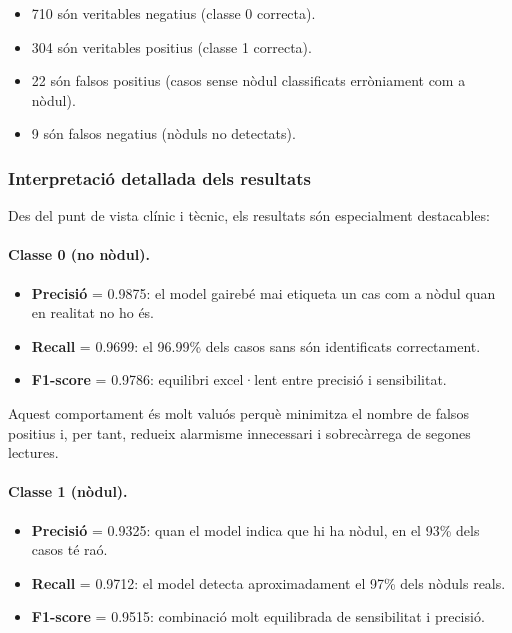 \documentclass[12pt,a4paper]{article}
\begin{document}
\begin{itemize}
    \item 710 són veritables negatius (classe 0 correcta).
    \item 304 són veritables positius (classe 1 correcta).
    \item 22 són falsos positius (casos sense nòdul classificats erròniament com a nòdul).
    \item 9 són falsos negatius (nòduls no detectats).
\end{itemize}

\subsubsection{Interpretació detallada dels resultats}

Des del punt de vista clínic i tècnic, els resultats són especialment destacables:

\paragraph{Classe 0 (no nòdul).}
\begin{itemize}
    \item \textbf{Precisió} = 0.9875: el model gairebé mai etiqueta un cas com a nòdul quan en realitat no ho és.
    \item \textbf{Recall} = 0.9699: el 96.99\% dels casos sans són identificats correctament.
    \item \textbf{F1-score} = 0.9786: equilibri excel·lent entre precisió i sensibilitat.
\end{itemize}

Aquest comportament és molt valuós perquè minimitza el nombre de falsos positius i, per tant, redueix
alarmisme innecessari i sobrecàrrega de segones lectures.

\paragraph{Classe 1 (nòdul).}
\begin{itemize}
    \item \textbf{Precisió} = 0.9325: quan el model indica que hi ha nòdul, en el 93\% dels casos té raó.
    \item \textbf{Recall} = 0.9712: el model detecta aproximadament el 97\% dels nòduls reals.
    \item \textbf{F1-score} = 0.9515: combinació molt equilibrada de sensibilitat i precisió.
\end{itemize}
\end{document}
